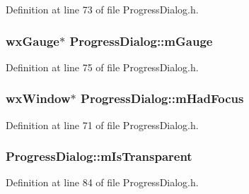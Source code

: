 Definition at line 73 of file Progress\+Dialog.\+h.

\subsubsection[{\texorpdfstring{m\+Gauge}{mGauge}}]{\setlength{\rightskip}{0pt plus 5cm}wx\+Gauge$\ast$ Progress\+Dialog\+::m\+Gauge\hspace{0.3cm}{\ttfamily [protected]}}\hypertarget{class_progress_dialog_a1c220266931cd60d76ddf0f1de6c5d93}{}\label{class_progress_dialog_a1c220266931cd60d76ddf0f1de6c5d93}


Definition at line 75 of file Progress\+Dialog.\+h.

\subsubsection[{\texorpdfstring{m\+Had\+Focus}{mHadFocus}}]{\setlength{\rightskip}{0pt plus 5cm}wx\+Window$\ast$ Progress\+Dialog\+::m\+Had\+Focus\hspace{0.3cm}{\ttfamily [protected]}}\hypertarget{class_progress_dialog_a0bff55d2f66d08b8ab01721500dc5ab4}{}\label{class_progress_dialog_a0bff55d2f66d08b8ab01721500dc5ab4}


Definition at line 71 of file Progress\+Dialog.\+h.

\subsubsection[{\texorpdfstring{m\+Is\+Transparent}{mIsTransparent}}]{ Progress\+Dialog\+::m\+Is\+Transparent\hspace{0.3cm}{\ttfamily [protected]}}\hypertarget{class_progress_dialog_a821cd27b713fc013b94e3a3a8e4a5a01}{}\label{class_progress_dialog_a821cd27b713fc013b94e3a3a8e4a5a01}


Definition at line 84 of file Progress\+Dialog.\+h.

